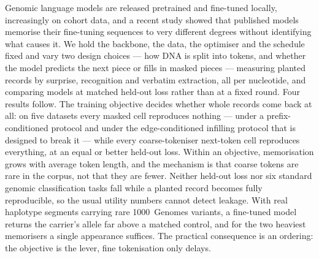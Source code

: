 Genomic language models are released pretrained and fine-tuned locally, increasingly on cohort data,
and a recent study showed that published models memorise their fine-tuning sequences to very
different degrees without identifying what causes it. We hold the backbone, the data, the optimiser
and the schedule fixed and vary two design choices --- how DNA is split into tokens, and whether the
model predicts the next piece or fills in masked pieces --- measuring planted records by surprise,
recognition and verbatim extraction, all per nucleotide, and comparing models at matched held-out
loss rather than at a fixed round. Four results follow. The training objective decides whether whole
records come back at all: on five datasets every masked cell reproduces nothing --- under a prefix-conditioned
protocol and under the edge-conditioned infilling protocol that is designed to break it --- while
every coarse-tokeniser next-token cell reproduces everything, at an equal or better held-out loss. Within
an objective, memorisation grows with average token length, and the mechanism is that coarse tokens
are rare in the corpus, not that they are fewer. Neither held-out loss nor six standard genomic
classification tasks fall while a planted record becomes fully reproducible, so the usual utility
numbers cannot detect leakage. With real haplotype segments carrying rare 1000~Genomes variants, a
fine-tuned model returns the carrier's allele far above a matched control, and for the two heaviest
memorisers a single appearance suffices. The practical consequence is an ordering: the objective is
the lever, fine tokenisation only delays.
